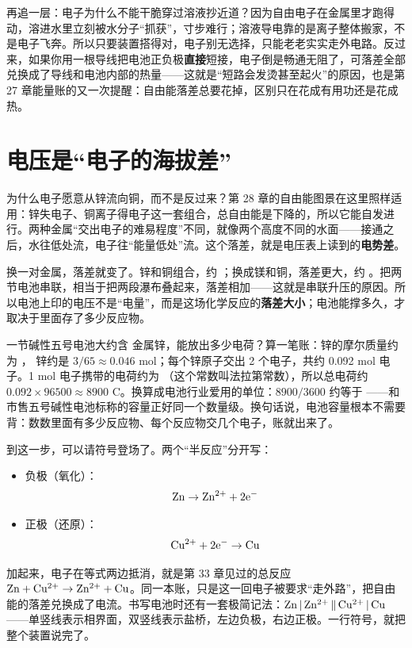 再追一层：电子为什么不能干脆穿过溶液抄近道？因为自由电子在金属里才跑得动，溶进水里立刻被水分子“抓获”，寸步难行；溶液导电靠的是离子整体搬家，不是电子飞奔。所以只要装置搭得对，电子别无选择，只能老老实实走外电路。反过来，如果你用一根导线把电池正负极\textbf{直接}短接，电子倒是畅通无阻了，可落差全部兑换成了导线和电池内部的热量——这就是“短路会发烫甚至起火”的原因，也是第 27 章能量账的又一次提醒：自由能落差总要花掉，区别只在花成有用功还是花成热。

\section{电压是“电子的海拔差”}

为什么电子愿意从锌流向铜，而不是反过来？第 28 章的自由能图景在这里照样适用：锌失电子、铜离子得电子这一套组合，总自由能是下降的，所以它能自发进行。两种金属“交出电子的难易程度”不同，就像两个高度不同的水面——接通之后，水往低处流，电子往“能量低处”流。这个落差，就是电压表上读到的\textbf{电势差}。

换一对金属，落差就变了。锌和铜组合，约 ；换成镁和铜，落差更大，约 。把两节电池串联，相当于把两段瀑布叠起来，落差相加——这就是串联升压的原因。所以电池上印的电压不是“电量”，而是这场化学反应的\textbf{落差大小}；电池能撑多久，才取决于里面存了多少反应物。

\begin{qiaoliang}
一节碱性五号电池大约含  金属锌，能放出多少电荷？算一笔账：锌的摩尔质量约为 ， 锌约是 $3/65\approx 0.046$ mol；每个锌原子交出 2 个电子，共约 0.092 mol 电子。1 mol 电子携带的电荷约为 （这个常数叫法拉第常数），所以总电荷约 $0.092\times 96500\approx 8900$ C。换算成电池行业爱用的单位：$8900/3600$ 约等于 ——和市售五号碱性电池标称的容量正好同一个数量级。换句话说，电池容量根本不需要背：数数里面有多少反应物、每个反应物交几个电子，账就出来了。
\end{qiaoliang}

到这一步，可以请符号登场了。两个“半反应”分开写：

\begin{itemize}[itemsep=2pt]
\item 负极（氧化）：\[\mathrm{Zn} \rightarrow \mathrm{Zn^{2+}} + \mathrm{2e^-}\]
\item 正极（还原）：\[\mathrm{Cu^{2+}} + \mathrm{2e^-} \rightarrow \mathrm{Cu}\]
\end{itemize}

加起来，电子在等式两边抵消，就是第 33 章见过的总反应 $\mathrm{Zn} + \mathrm{Cu^{2+}} \rightarrow \mathrm{Zn^{2+}} + \mathrm{Cu}$。同一本账，只是这一回电子被要求“走外路”，把自由能的落差兑换成了电流。书写电池时还有一套极简记法：$\mathrm{Zn}\,|\,\mathrm{Zn^{2+}}\,\|\,\mathrm{Cu^{2+}}\,|\,\mathrm{Cu}$——单竖线表示相界面，双竖线表示盐桥，左边负极，右边正极。一行符号，就把整个装置说完了。

